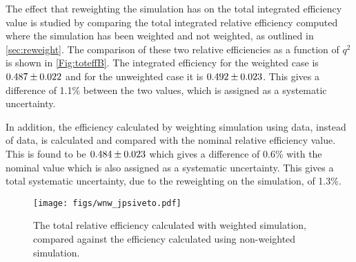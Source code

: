 The effect that reweighting the simulation has on the total integrated efficiency value is studied by comparing the total integrated relative efficiency computed where the simulation has been weighted and not weighted, as outlined in \autoref{sec:reweight}. The comparison of these two relative efficiencies as a function of $q^{2}$ is shown in \autoref{Fig:toteffB}. The integrated efficiency for the weighted case is $0.487\pm0.022$ and for the unweighted case it is $0.492\pm0.023$. This gives a difference of 1.1\% between the two values, which is assigned as a systematic uncertainty.

In addition, the efficiency calculated by weighting simulation using \LbKjpsi data, instead of \Lbpijpsi data, is calculated and compared with the nominal relative efficiency value. This is found to be $0.484\pm0.023$ which gives a difference of 0.6\% with the nominal value which is also assigned as a systematic uncertainty. This gives a total systematic uncertainty, due to the reweighting on the simulation, of 1.3\%.


\begin{figure}[h]
  \centering
  \texttt{[image: figs/wnw\_jpsiveto.pdf]}%
    \caption{ The total relative efficiency calculated with weighted simulation, compared against the efficiency calculated using non-weighted simulation.}
\label{Fig:toteffB}

\end{figure}




